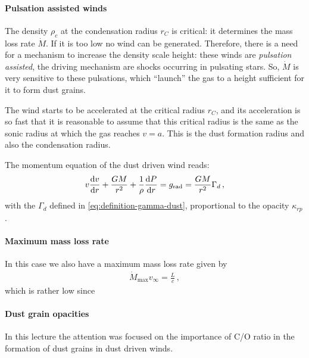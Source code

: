\documentclass[main.tex]{subfiles}
\begin{document}


\paragraph{Pulsation assisted winds}

The density \(\rho_{c}\) at the condensation radius \(r_C\) is critical: it determines the mass loss rate \(\dot{M}\). 
If it is too low no wind can be generated.
Therefore, there is a need for a mechanism to increase the density scale height: these winds are \emph{pulsation assisted}, the driving mechanism are shocks occurring in pulsating stars.
So, \(\dot{M}\) is very sensitive to these pulsations, which ``launch'' the gas to a height sufficient for it to form dust grains.

The wind starts to be accelerated at the critical radius \(r_C\), and its acceleration is so fast that it is reasonable to assume that this critical radius is the same as the sonic radius at which the gas reaches \(v=a\). 
This is the dust formation radius and also the condensation radius.

The momentum equation of the dust driven wind reads: 
%
\begin{align}
v \dv{v}{r} + \frac{GM}{r^2} + \frac{1}{\rho }\dv{P}{r} = g _{\text{rad}} = \frac{GM}{r^2} \Gamma_{d}
\,,
\end{align}
%
with the \(\Gamma_{d}\) defined in \eqref{eq:definition-gamma-dust}, proportional to the opacity \(\kappa_{rp}\).

\paragraph{Maximum mass loss rate}

In this case we also have a maximum mass loss rate given by 
%
\begin{align}
\dot{M} _{\text{max}} v_{ \infty } = \frac{L}{c}
\,,
\end{align}
%
which is rather low since 

\paragraph{Dust grain opacities}

In this lecture the attention was focused on the importance of C/O ratio in the formation of dust grains in dust driven winds. 
\end{document}
